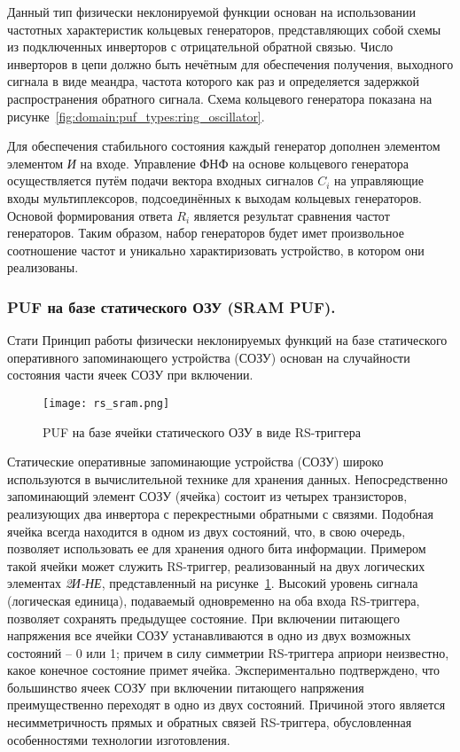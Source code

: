 \begin{enumerate}
Данный тип физически неклонируемой функции основан на использовании частотных характеристик кольцевых генераторов, представляющих собой схемы из подключенных инверторов с отрицательной обратной связью. Число инверторов в цепи должно быть нечётным для обеспечения получения, выходного сигнала в виде меандра, частота которого как раз и определяется задержкой распространения обратного сигнала. Схема кольцевого генератора показана на рисунке~\ref{fig:domain:puf_types:ring_oscillator}.

Для обеспечения стабильного состояния каждый генератор дополнен элементом элементом \emph{И} на входе. Управление ФНФ на основе кольцевого генератора осуществляется путём подачи вектора входных сигналов $C_i$ на управляющие входы мультиплексоров, подсоединённых к выходам кольцевых генераторов. Основой формирования ответа $R_i$ является результат сравнения частот генераторов. Таким образом, набор генераторов будет имет произвольное соотношение частот и уникально характиризовать устройство, в котором они реализованы.

\subsubsection{PUF на базе статического ОЗУ (SRAM PUF). }
\label{sub:domain:puf_types:sram}
Стати
Принцип работы физически неклонируемых функций на базе статического оперативного запоминающего устройства (СОЗУ) основан на случайности состояния части ячеек СОЗУ при включении.

\begin{figure}[ht]
    \centering
    \texttt{[image: rs\_sram.png]}
    \caption{PUF на базе ячейки статического ОЗУ в виде RS-триггера}
    \label{fig:domain:puf_types:sram}
\end{figure}

Статические оперативные запоминающие устройства (СОЗУ) широко используются в вычислительной технике для хранения данных. Непосредственно запоминающий элемент СОЗУ (ячейка) состоит из четырех транзисторов, реализующих два инвертора с перекрестными обратными с связями. Подобная ячейка всегда находится в одном из двух состояний, что, в свою очередь, позволяет использовать ее для хранения одного бита информации. Примером такой ячейки может служить RS-триггер, реализованный на двух логических элементах \emph{2И-НЕ}, представленный на рисунке~\ref{fig:domain:puf_types:sram}. Высокий уровень сигнала (логическая единица), подаваемый одновременно на оба входа RS-триггера, позволяет сохранять предыдущее состояние. При включении питающего напряжения все ячейки СОЗУ устанавливаются в одно из двух возможных состояний -- 0 или 1; причем в силу симметрии RS-триггера априори неизвестно, какое конечное состояние примет ячейка. Экспериментально подтверждено, что большинство ячеек СОЗУ при включении питающего напряжения преимущественно переходят в одно из двух состояний. Причиной этого является несимметричность прямых и обратных связей RS-триггера, обусловленная особенностями технологии изготовления.



\end{enumerate}
